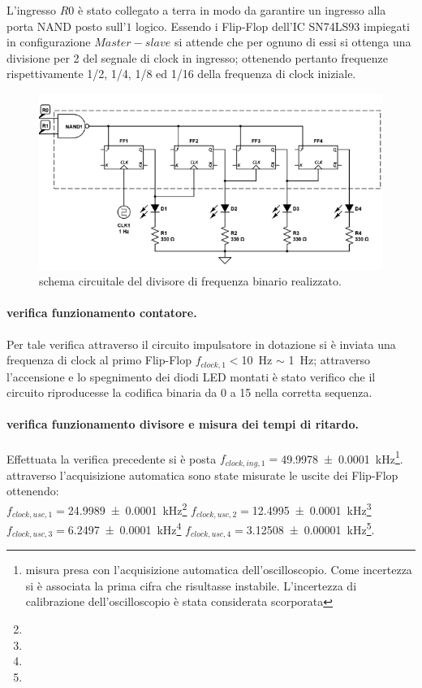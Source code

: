 	L'ingresso $R0$ è stato collegato a terra in modo da garantire un ingresso alla porta NAND posto sull'$1$ logico.
	Essendo i Flip-Flop dell'IC SN74LS93  impiegati in configurazione $Master-slave$
	si attende che per ognuno di essi si ottenga una divisione per 2 del segnale di clock in ingresso; ottenendo pertanto frequenze rispettivamente 1/2, 1/4, 1/8 ed 1/16 della frequenza di
	clock iniziale.
	\begin{figure}[htb]
		\centering
		\includegraphics[scale=0.5]{../Figs-Tabs/divisori.png}
		\caption{schema circuitale del divisore di frequenza binario realizzato.}
		\label{f:div1}
	\end{figure}
\paragraph{verifica funzionamento contatore.}
	Per tale verifica attraverso il circuito impulsatore in dotazione
	si è inviata una frequenza di clock al primo Flip-Flop $f_{clock,1}<$\SI{10}{\hertz} $\sim$ \SI{1}{\hertz};
	attraverso l'accensione e lo spegnimento dei diodi LED montati è stato verifico che il circuito riproducesse la codifica binaria da 0 a 15 nella corretta sequenza.
\paragraph{verifica funzionamento divisore e misura dei tempi di ritardo.}
	Effettuata la verifica precedente si è posta $f_{clock,ing,1}=$\SI{49.9978 \pm 0.0001}{ \kilo \hertz}\footnote{misura presa con l'acquisizione automatica dell'oscilloscopio. Come incertezza si è associata la prima cifra che risultasse instabile. L'incertezza di calibrazione dell'oscilloscopio è stata considerata scorporata}.
	attraverso l'acquisizione automatica sono state misurate le uscite dei Flip-Flop ottenendo:\\
	$f_{clock,usc,1}=$\SI{24.9989 \pm 0.0001}{ \kilo \hertz}\footnote[1]{ } \qquad
	$f_{clock,usc,2}=$\SI{12.4995 \pm 0.0001}{ \kilo \hertz}\footnote[1]{ }\\
	$f_{clock,usc,3}=$\SI{ 6.2497 \pm 0.0001}{ \kilo \hertz}\footnote[1]{ }\qquad
	$f_{clock,usc,4}=$\SI{3.12508 \pm 0.00001}{ \kilo \hertz}\footnote[1]{ }.\\

